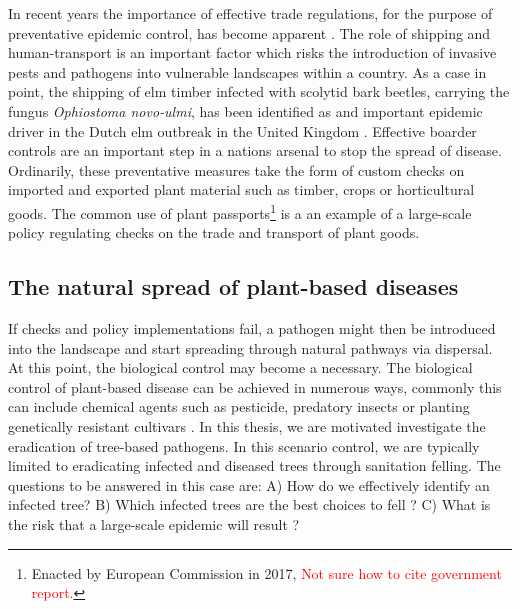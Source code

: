 In recent years the importance of effective trade regulations, for the purpose of preventative epidemic control, has become apparent \cite{rodoni2009role}. The role of shipping and human-transport is an important factor which risks the introduction of invasive pests and pathogens into vulnerable landscapes within a country. As a case in point, the shipping of elm timber infected with scolytid bark beetles, carrying the fungus \textit{Ophiostoma novo‐ulmi}, has been identified as and important epidemic driver in the Dutch elm outbreak in the United Kingdom \cite{doi:10.1111/j.1365-3059.2010.02391.x}. Effective boarder controls are an important step in a nations arsenal to stop the spread of disease. Ordinarily, these preventative measures take the form of custom checks on imported and exported plant material such as timber, crops or horticultural goods. The common use of plant passports\footnote{Enacted by European Commission in 2017, \textcolor{red}{Not sure how to cite government report.}} is a an example of a large-scale policy regulating checks on the trade and transport of plant goods. 

\subsection{The natural spread of plant-based diseases}
If checks and policy implementations fail, a pathogen might then be introduced into the landscape and start spreading through natural pathways via dispersal. At this point, the biological control may become a necessary. The biological control of plant-based disease can be achieved in numerous ways, commonly this can include chemical agents such as pesticide, predatory insects or planting genetically resistant cultivars \cite{pal2006biological, baker1974biological}. In this thesis, we are motivated investigate the eradication of tree-based pathogens. In this scenario control, we are typically limited to eradicating infected and diseased trees through sanitation felling. The questions to be answered in this case are: A) How do we effectively identify an infected tree? B) Which infected trees are the best choices to fell ? C) What is the risk that a large-scale epidemic will result ?\\


